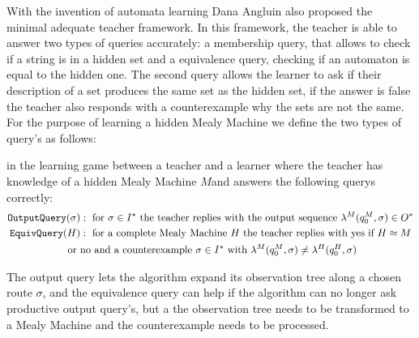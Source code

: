 With the invention of automata learning Dana Angluin also proposed the minimal adequate teacher framework. In this framework, the teacher is able to answer two types of queries accurately: a membership query, that allows to check if a string is in a hidden set and a equivalence query, checking if an automaton is equal to the hidden one. The second query allows the learner to ask if their description of a set produces the same set as the hidden set, if the answer is false the teacher also responds with a counterexample why the sets are not the same.\cite{angluin}\\
For the purpose of learning a hidden Mealy Machine we define the two types of query's as follows:
\begin{definition}\label{def:queries}
	in the learning game between a teacher and a learner where the teacher has knowledge of a hidden Mealy Machine $M$and answers the following querys correctly:
	\begin{gather*}\textnormal{\texttt{OutputQuery}}(\sigma): \text{ for }\sigma\in I^*\text{ the teacher replies with the output sequence } \lambda^M(q_0^M,\sigma)\in O^*\\
	\textnormal{\texttt{EquivQuery}}(H):\text{ for a complete Mealy Machine } H \text{ the teacher replies with yes if }H\approx M\\\text{ or no and a counterexample } \sigma\in I^*\text{ with }\lambda^M(q_0^M,\sigma)\neq\lambda^H(q_0^H,\sigma)
	\end{gather*}
\end{definition}
The output query lets the algorithm expand its observation tree along a chosen route $\sigma$, and the equivalence query can help if the algorithm can no longer ask productive output query's, but a the observation tree needs to be transformed to a Mealy Machine and the counterexample needs to be processed.

